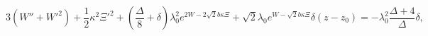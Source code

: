 \begin{equation}
 3(W'' + {W'}^{2}) + \frac{1}{2} \kappa^{2} {\Xi'}^{2} +
\left(\frac{\Delta}{8} + \delta \right) \lambda_{0}^{2} e^{2W - 2 \sqrt{2} b \kappa \Xi}
+ \sqrt{2} \lambda_{0} e^{W - \sqrt{2} b \kappa \Xi} \delta(z - z_{0}) 
= -\lambda_0^2 \frac{\Delta+4}{\Delta} \delta,
\label{eq:Einstein_ttz}
\end{equation}

